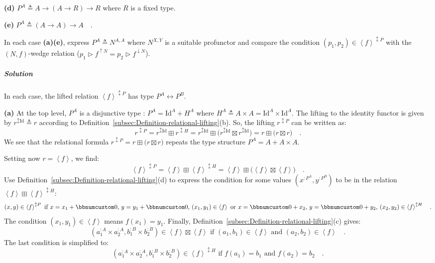 \textbf{(d)} $P^{A}\triangleq A\rightarrow\left(A\rightarrow R\right)\rightarrow R$
where $R$ is a fixed type.

\textbf{(e)} $P^{A}\triangleq\left(A\rightarrow A\right)\rightarrow A\quad$.

In each case \textbf{(a)}\textendash \textbf{(e)}, express $P^{A}\triangleq N^{A,A}$
where $N^{X,Y}$ is a suitable profunctor and compare the condition
$(p_{1},p_{2})\in\left<f\right>^{\updownarrow P}$ with the $\left(N,f\right)$-wedge
relation ($p_{1}\triangleright f^{\uparrow N}=p_{2}\triangleright f^{\downarrow N}$). 

\subparagraph{Solution}

In each case, the lifted relation $\left<f\right>^{\updownarrow P}$
has type $P^{A}\leftrightarrow P^{B}$.

\textbf{(a)} At the top level, $P^{A}$ is a disjunctive type : $P^{A}=\text{Id}^{A}+H^{A}$
where $H^{A}\triangleq A\times A=\text{Id}^{A}\times\text{Id}^{A}$.
The lifting to the identity functor is given by $r^{\updownarrow\text{Id}}\triangleq r$
according to Definition~\ref{subsec:Definition-relational-lifting}(b).
So, the lifting $r^{\updownarrow P}$ can be written as:
\[
r^{\updownarrow P}=r^{\updownarrow\text{Id}}\boxplus r^{\updownarrow H}=r^{\updownarrow\text{Id}}\boxplus\big(r^{\updownarrow\text{Id}}\boxtimes r^{\updownarrow\text{Id}}\big)=r\boxplus\big(r\boxtimes r\big)\quad.
\]
We see that the relational formula $r^{\updownarrow P}=r\boxplus\big(r\boxtimes r\big)$
repeats the type structure $P^{A}=A+A\times A$.

Setting now $r=\left<f\right>$, we find:
\[
\left<f\right>^{\updownarrow P}=\left<f\right>\boxplus\left<f\right>^{\updownarrow H}=\left<f\right>\boxplus\big(\left<f\right>\boxtimes\left<f\right>\big)\quad.
\]
Use Definition~\ref{subsec:Definition-relational-lifting}(d) to
express the condition for some values $(x^{:P^{A}},y^{:P^{B}})$ to
be in the relation $\left<f\right>\boxplus\left<f\right>^{\updownarrow H}$:
\[
(x,y)\in\left<f\right>^{\updownarrow P}\text{ if }x=x_{1}+\bbnum 0,\,y=y_{1}+\bbnum 0,\,(x_{1},y_{1})\in\left<f\right>\text{ or }x=\bbnum 0+x_{2},\,y=\bbnum 0+y_{2},\,(x_{2},y_{2})\in\left<f\right>^{\updownarrow H}\quad.
\]
The condition $(x_{1},y_{1})\in\left<f\right>$ means $f(x_{1})=y_{1}$.
Finally, Definition~\ref{subsec:Definition-relational-lifting}(c)
gives:
\[
(a_{1}^{:A}\times a_{2}^{:A},b_{1}^{:B}\times b_{2}^{:B})\in\left<f\right>\boxtimes\left<f\right>\text{ if }(a_{1},b_{1})\in\left<f\right>\text{ and }(a_{2},b_{2})\in\left<f\right>\quad.
\]
The last condition is simplified to:
\[
(a_{1}^{:A}\times a_{2}^{:A},b_{1}^{:B}\times b_{2}^{:B})\in\left<f\right>^{\updownarrow H}\text{ if }f(a_{1})=b_{1}\text{ and }f(a_{2})=b_{2}\quad.
\]

